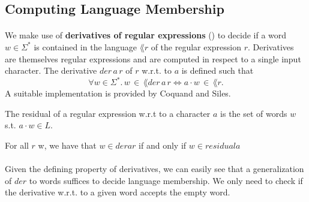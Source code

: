 \documentclass[11pt,a4paper,oneside]{book}
\begin{document}

                \subsection{Computing Language Membership}
                    \paragraph{}
                We make use of \textbf{derivatives of regular expressions} (\cite{DBLP:journals/jacm/Brzozowski64}) to decide if a word $w \in \Sigma^*$ is contained in the language $\lang{r}$ of the regular expression $r$. 
                Derivatives are themselves regular expressions and are computed in respect to a single input character. The derivative $der \,  a \, r$ of $r$ w.r.t. to $a$ is defined such that 
                \[
                    \forall w \in \Sigma^*. \, w \, \in \, \lang{der \, a \, r} \Leftrightarrow a\cdot w \, \in \, \lang{r}.
                \]
                A suitable implementation is provided by Coquand and Siles.


                \begin{definition}{}
                    \label{residual}
                    The residual of a regular expression w.r.t to a character $a$ is the set of words $w$ s.t. $a \cdot w \in L$.
                \end{definition}

                \begin{theorem}
                    \label{der_correct}
                    For all $r$ w, we have that $w \in der a r$ if and only if $w \in residual a $
                \end{theorem}

                \paragraph{} 
                    Given the defining property of derivatives, we can easily see that a generalization of $der$ to words suffices to decide language membership. We only need to check if the derivative w.r.t. to a given word accepts the empty word.

\end{document}
